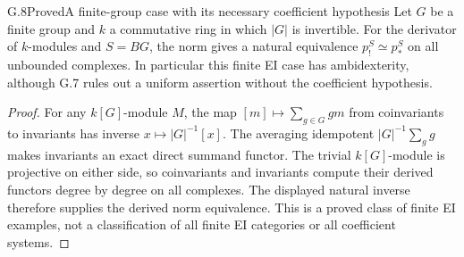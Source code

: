 \begin{claim}{G.8}{Proved}{A finite-group case with its necessary coefficient hypothesis}
Let $G$ be a finite group and $k$ a commutative ring in which
$|G|$ is invertible. For the derivator of $k$-modules and
$S=BG$, the norm gives a natural equivalence $p_!^S\simeq p_*^S$
on all unbounded complexes. In particular this finite EI case has
ambidexterity, although G.7 rules out a uniform assertion without
the coefficient hypothesis.
\end{claim}
\begin{proof}
For any $k[G]$-module $M$, the map
$[m]\mapsto\sum_{g\in G}gm$ from coinvariants to invariants
has inverse $x\mapsto |G|^{-1}[x]$. The averaging idempotent
$|G|^{-1}\sum_g g$ makes invariants an exact direct summand
functor. The trivial $k[G]$-module is projective on either side,
so coinvariants and invariants compute their derived functors
degree by degree on all complexes. The displayed natural inverse
therefore supplies the derived norm equivalence. This is a proved
class of finite EI examples, not a classification of all finite EI
categories or all coefficient systems.
\end{proof}

